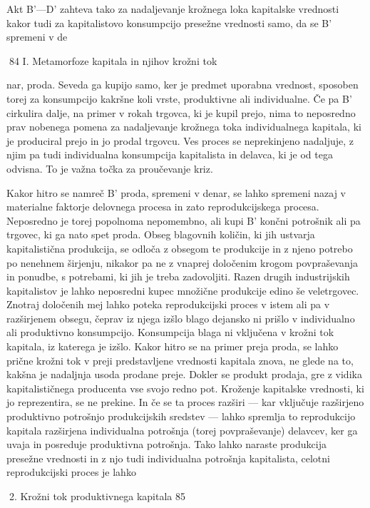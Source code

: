 \documentclass[kapital_02.tex]{subfiles}
\begin{document}
Akt B'—D' zahteva tako za nadaljevanje krožnega loka kapitalske vrednosti kakor tudi za kapitalistovo konsumpcijo presežne vrednosti samo, da se B' spremeni v de

 84 I. Metamorfoze kapitala in njihov krožni tok



 nar, proda. Seveda ga kupijo samo, ker je predmet uporabna vrednost, sposoben torej za konsumpcijo kakršne koli vrste, produktivne ali individualne. Če pa B' cirkulira dalje, na primer v rokah trgovca, ki je kupil prejo, nima to neposredno prav nobenega pomena za nadaljevanje krožnega toka individualnega kapitala, ki je produciral prejo in jo prodal trgovcu. Ves proces se neprekinjeno nadaljuje, z njim pa tudi individualna konsumpcija kapitalista in delavca, ki je od tega odvisna. To je važna točka za proučevanje kriz.

Kakor hitro se namreč B' proda, spremeni v denar, se lahko spremeni nazaj v materialne faktorje delovnega procesa in zato reprodukcijskega procesa. Neposredno je torej popolnoma nepomembno, ali kupi B' končni potrošnik ali pa trgovec, ki ga nato spet proda. Obseg blagovnih količin, ki jih ustvarja kapitalistična produkcija, se odloča z obsegom te produkcije in z njeno potrebo po nenehnem širjenju, nikakor pa ne z vnaprej določenim krogom povpraševanja in ponudbe, s potrebami, ki jih je treba zadovoljiti. Razen drugih industrijskih kapitalistov je lahko neposredni kupec množične produkcije edino še veletrgovec. Znotraj določenih mej lahko poteka reprodukcijski proces v istem ali pa v razširjenem obsegu, čeprav iz njega izšlo blago dejansko ni prišlo v individualno ali produktivno konsumpcijo. Konsumpcija blaga ni vključena v krožni tok kapitala, iz katerega je izšlo. Kakor hitro se na primer preja proda, se lahko prične krožni tok v preji predstavljene vrednosti kapitala znova, ne glede na to, kakšna je nadaljnja usoda prodane preje. Dokler se produkt prodaja, gre z vidika kapitalističnega producenta vse svojo redno pot. Kroženje kapitalske vrednosti, ki jo reprezentira, se ne prekine. In če se ta proces razširi — kar vključuje razširjeno produktivno potrošnjo produkcijskih sredstev — lahko spremlja to reprodukcijo kapitala razširjena individualna potrošnja (torej povpraševanje) delavcev, ker ga uvaja in posreduje produktivna potrošnja. Tako lahko naraste produkcija presežne vrednosti in z njo tudi individualna potrošnja kapitalista, celotni reprodukcijski proces je lahko



2. Krožni tok produktivnega kapitala 85
\end{document}
